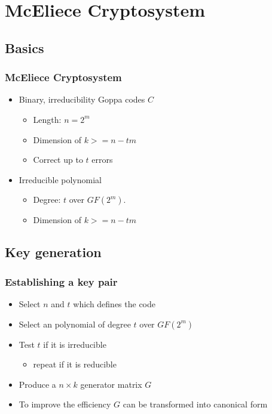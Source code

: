 \section{McEliece Cryptosystem}

	\subsection{Basics}
		\begin{frame}
			\frametitle{McEliece Cryptosystem}
			\begin{itemize}
				\item Binary, irreducibility Goppa codes $C$
				\begin{itemize}
					\item Length: $n = 2^m$
					\item Dimension of $k >= n - tm$
					\item Correct up to $t$ errors	
				\end{itemize}
				\item Irreducible polynomial 
				\begin{itemize}
					\item Degree: $t$ over $GF(2^m)$. 
					\item Dimension of $k >= n - tm$
				\end{itemize}				
			\end{itemize}
		\end{frame}

	\subsection{Key generation}
		\begin{frame}
			\frametitle{Establishing a key pair}
			\begin{itemize}
				\item Select $n$ and $t$ which defines the code
				\item Select an polynomial of degree $t$ over $GF(2^m)$
				\item Test $t$ if it is irreducible
				\begin{itemize}
					\item repeat if it is reducible
				\end{itemize}
				\item Produce a $n \times k$ generator matrix $G$
				\item To improve the efficiency $G$ can be transformed into canonical form
			\end{itemize}
		\end{frame}
	

